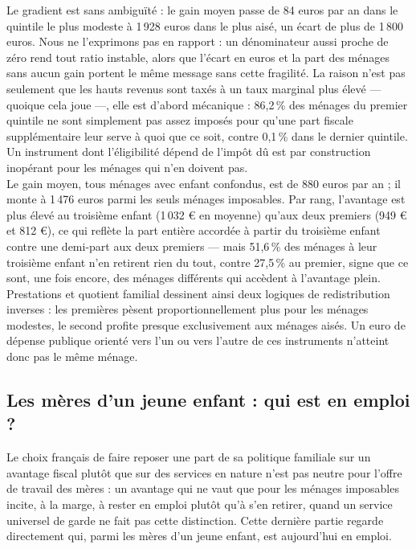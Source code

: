 \documentclass[12pt,a4paper]{article}
\begin{document}
\bigskip

\noindent Le gradient est sans ambiguïté : le gain moyen passe de 84 euros par an dans le quintile le plus modeste à 1\,928 euros dans le plus aisé, un écart de plus de 1\,800 euros. Nous ne l'exprimons pas en rapport : un dénominateur aussi proche de zéro rend tout ratio instable, alors que l'écart en euros et la part des ménages sans aucun gain portent le même message sans cette fragilité. La raison n'est pas seulement que les hauts revenus sont taxés à un taux marginal plus élevé — quoique cela joue —, elle est d'abord mécanique : 86,2\,\% des ménages du premier quintile ne sont simplement pas assez imposés pour qu'une part fiscale supplémentaire leur serve à quoi que ce soit, contre 0,1\,\% dans le dernier quintile. Un instrument dont l'éligibilité dépend de l'impôt dû est par construction inopérant pour les ménages qui n'en doivent pas. \\

\noindent Le gain moyen, tous ménages avec enfant confondus, est de 880 euros par an ; il monte à 1\,476 euros parmi les seuls ménages imposables. Par rang, l'avantage est plus élevé au troisième enfant (1\,032 € en moyenne) qu'aux deux premiers (949 € et 812 €), ce qui reflète la part entière accordée à partir du troisième enfant contre une demi-part aux deux premiers — mais 51,6\,\% des ménages à leur troisième enfant n'en retirent rien du tout, contre 27,5\,\% au premier, signe que ce sont, une fois encore, des ménages différents qui accèdent à l'avantage plein. \\

\noindent Prestations et quotient familial dessinent ainsi deux logiques de redistribution inverses : les premières pèsent proportionnellement plus pour les ménages modestes, le second profite presque exclusivement aux ménages aisés. Un euro de dépense publique orienté vers l'un ou vers l'autre de ces instruments n'atteint donc pas le même ménage.

\subsection{Les mères d'un jeune enfant : qui est en emploi ?}

Le choix français de faire reposer une part de sa politique familiale sur un avantage fiscal plutôt que sur des services en nature n'est pas neutre pour l'offre de travail des mères : un avantage qui ne vaut que pour les ménages imposables incite, à la marge, à rester en emploi plutôt qu'à s'en retirer, quand un service universel de garde ne fait pas cette distinction. Cette dernière partie regarde directement qui, parmi les mères d'un jeune enfant, est aujourd'hui en emploi. \\
\end{document}
